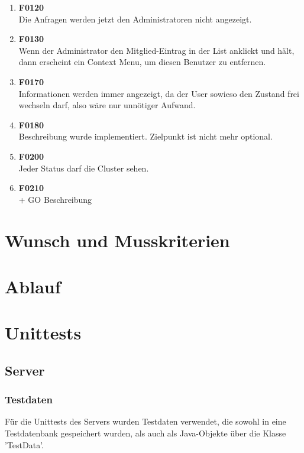 \documentclass[11pt,a4paper]{scrartcl}
\begin{document}
\begin{enumerate}
 \item \textbf{F0120}\\ Die Anfragen werden jetzt den Administratoren nicht angezeigt.

\item \textbf{F0130}\\ Wenn der Administrator den Mitglied-Eintrag in der List anklickt und hält, dann erscheint ein Context Menu, um diesen Benutzer zu entfernen.

\item \textbf{F0170}\\ Informationen werden immer angezeigt, da der User sowieso den Zustand frei wechseln darf, also wäre nur unnötiger Aufwand.

\item \textbf{F0180}\\ Beschreibung wurde implementiert. Zielpunkt ist nicht mehr optional.

\item \textbf{F0200}\\ Jeder Status darf die Cluster sehen.

\item \textbf{F0210}\\ + GO Beschreibung
	
\end{enumerate}

\newpage

\section{Wunsch und Musskriterien}

\newpage

\section{Ablauf}

\newpage

\section{Unittests}

\subsection{Server}

\subsubsection{Testdaten}\label{Testdaten}
Für die Unittests des Servers wurden Testdaten verwendet, die sowohl in eine Testdatenbank gespeichert wurden, als auch als Java-Objekte über die Klasse 'TestData'.
\end{document}
